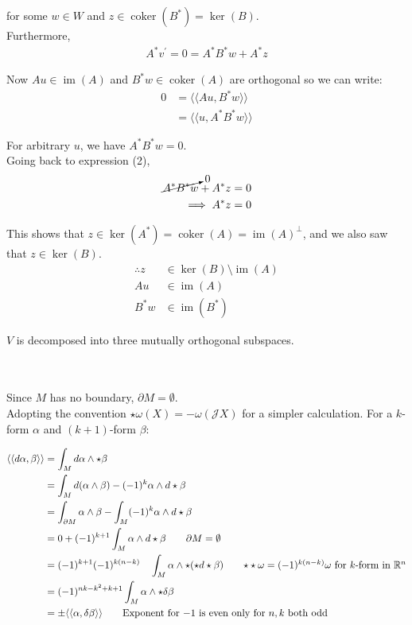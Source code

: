 \documentclass{article}
\def\cJ{\mathcal{J}}
\def\R{\mathbb{R}}
\def\R{\mathbb{R}}
\def\ll{\langle\langle}
\def\rr{\rangle\rangle}
\DeclareMathOperator{\img}{im}
\DeclareMathOperator{\coker}{coker}
\begin{document}
for some $w \in W$ and $z \in \coker(B^*) = \ker(B)$. \\

Furthermore,
\begin{align}
    A^*v^\prime = 0 = A^*B^*w + A^*z
\end{align}

Now $Au \in \img(A)$ and $B^*w \in \coker(A)$ are orthogonal so we can write:
\begin{align*}
    0 &= \ll Au, B^*w \rr \\
        &= \ll u, A^*B^*w \rr
\end{align*}

For arbitrary $u$, we have $A^*B^*w = 0$. \\

Going back to expression (2),
\begin{align*}
    \cancelto{0}{A^*B^*w} + A^*z = 0 \\
    \implies A^*z = 0
\end{align*}

This shows that $z \in \ker(A^*) = \coker(A) = \img(A)^\perp$, and we also saw that $z \in \ker(B)$.
\begin{align*}
    \therefore z &\in \ker(B) \setminus \img(A) \\
    Au &\in \img(A) \\
    B^*w &\in \img(B^*)
\end{align*}

$V$ is decomposed into three mutually orthogonal subspaces.


\pagebreak
{}\\\\

Since $M$ has no boundary, $\partial M = \emptyset$. \\

Adopting the convention $\star \omega(X) = -\omega(\cJ X)$ for a simpler calculation.
For a $k$-form $\alpha$ and $(k+1)$-form $\beta$:

\begin{align*}
    \ll d\alpha, \beta \rr &= \int_M d\alpha \wedge \star\beta \\
        &= \int_M d(\alpha \wedge \beta) - (-1)^k \alpha \wedge d\star\beta \\
        &= \int_{\partial M} \alpha \wedge \beta - \int_M (-1)^k \alpha \wedge d\star\beta \\
        &= 0 + (-1)^{k+1} \int_M \alpha \wedge d\star\beta \tag*{$\partial M = \emptyset$} \\
        &= (-1)^{k+1} (-1)^{k(n-k)} \quad \int_M \alpha \wedge \star (\star d\star\beta) \tag*{$\star\star \omega= (-1)^{k(n-k)} \omega$ for $k$-form in $\R^n$} \\
        &= (-1)^{nk-k^2+k+1} \int_M \alpha \wedge \star \delta\beta \\
        &= \pm \ll \alpha, \delta\beta \rr \tag*{Exponent for $-1$ is even only for $n, k$ both odd} \\
\end{align*}
\end{document}
